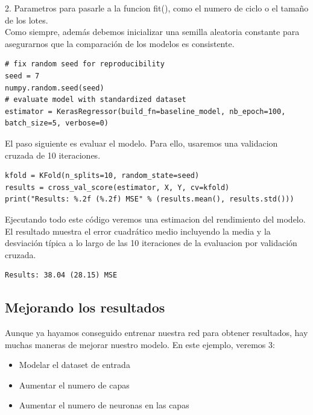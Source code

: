 2. Parametros para pasarle a la funcion fit(), como el numero de ciclo o el tamaño de los lotes.\\
Como siempre, además debemos inicializar una semilla aleatoria constante para asegurarnos que la comparación de los modelos es consistente.
\begin{verbatim}
# fix random seed for reproducibility
seed = 7
numpy.random.seed(seed)
# evaluate model with standardized dataset
estimator = KerasRegressor(build_fn=baseline_model, nb_epoch=100, batch_size=5, verbose=0)
\end{verbatim}
El paso siguiente es evaluar el modelo. Para ello, usaremos una validacion cruzada de 10 iteraciones.\\
\begin{verbatim}
kfold = KFold(n_splits=10, random_state=seed)
results = cross_val_score(estimator, X, Y, cv=kfold)
print("Results: %.2f (%.2f) MSE" % (results.mean(), results.std()))
\end{verbatim}
Ejecutando todo este código veremos una estimacion del rendimiento del modelo. El resultado muestra el error cuadrático medio incluyendo la media y la desviación típica a lo largo de las 10 iteraciones de la evaluacion por validación cruzada.
\begin{verbatim}
Results: 38.04 (28.15) MSE
\end{verbatim}
\subsection{Mejorando los resultados}
Aunque ya hayamos conseguido entrenar nuestra red para obtener resultados, hay muchas maneras de mejorar nuestro modelo. En este ejemplo, veremos 3:
\begin{itemize}
\item Modelar el dataset de entrada
\item Aumentar el numero de capas
\item Aumentar el numero de neuronas en las capas
\end{itemize}
